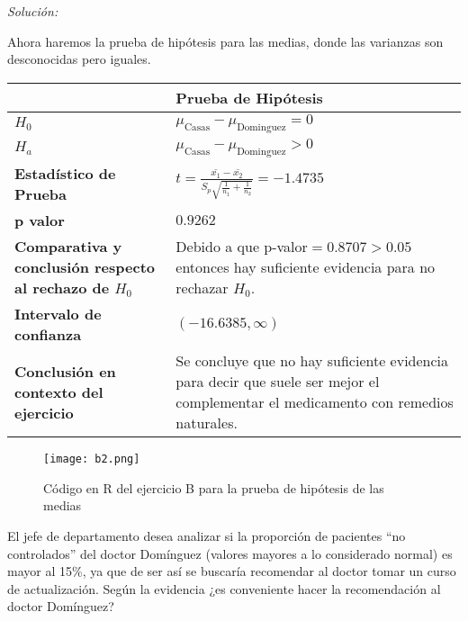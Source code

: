 \documentclass[12pt]{article}
\newenvironment{problem}[2][Problema]{\begin{trivlist}
\item[\hskip \labelsep {\bfseries #1}\hskip \labelsep {\bfseries #2.}]}{\end{trivlist}}
\newenvironment{sol}
    {\emph{Solución:}
    }
    {
    }
\begin{document}
\begin{sol}
Ahora haremos la prueba de hipótesis para las medias, donde las varianzas son desconocidas pero iguales.
\begin{table}[h!]
\centering
\begin{tabular}{|>{\raggedright\arraybackslash}m{6cm}|>{\raggedright\arraybackslash}m{6cm}|}
\hline
 & \textbf{Prueba de Hipótesis} \\ \hline
$H_0$ & $\mu_{\text{Casas}}-\mu_{\text{Dominguez}}=0$ \\ \hline
$H_a$ & $\mu_{\text{Casas}}-\mu_{\text{Dominguez}}>0$ \\ \hline
\textbf{Estadístico de Prueba} & \vspace{0.5cm}$t=\frac{\bar{x_1}-\bar{x_2}}{S_p\sqrt{\frac{1}{n_1}+\frac{1}{n_2}}}=-1.4735$\vspace{0.5cm} \\ \hline
\textbf{p valor} & $0.9262$ \\ \hline
\textbf{Comparativa y conclusión respecto al rechazo de $H_0$} & Debido a que p-valor$=0.8707>0.05$ entonces hay suficiente evidencia para no rechazar $H_0$. \\ \hline
\textbf{Intervalo de confianza} & $(-16.6385, \infty)$ \\ \hline
\textbf{Conclusión en contexto del ejercicio} & Se concluye que no hay suficiente evidencia para decir que suele ser mejor el complementar el medicamento con remedios naturales. \\ \hline
\end{tabular}
\label{tab:hipotesis}
\end{table}
\pagebreak
\begin{figure}[h]  %
    \centering      %
    \texttt{[image: b2.png]} 
    \caption{Código en R del ejercicio B para la prueba de hipótesis de las medias}
\end{figure}
\end{sol}
\pagebreak
\begin{problem}{C}
El jefe de departamento desea analizar si la proporción de pacientes “no controlados” del doctor Domínguez (valores mayores a lo considerado normal) es mayor al 15\%, ya que de ser así se buscaría recomendar al doctor tomar un curso de actualización. Según la evidencia ¿es conveniente hacer la recomendación al doctor Domínguez?
\end{problem}
\end{document}
